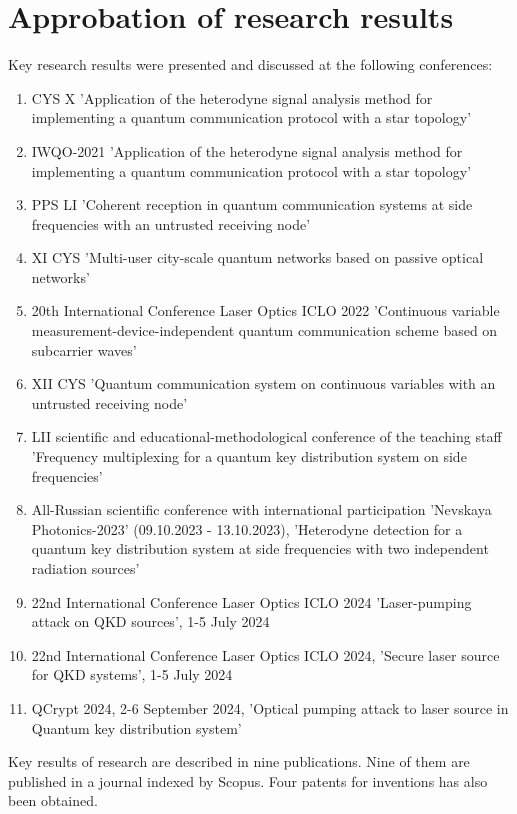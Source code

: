 \section*{Approbation of research results}
Key research results were presented and discussed at the following conferences:
\begin{enumerate}
    \item CYS X 'Application of the heterodyne signal analysis method for implementing a quantum communication protocol with a star topology'
    \item IWQO-2021 'Application of the heterodyne signal analysis method for implementing a quantum communication protocol with a star topology'
    \item PPS LI 'Coherent reception in quantum communication systems at side frequencies with an untrusted receiving node'
    \item XI CYS 'Multi-user city-scale quantum networks based on passive optical networks'
    \item 20th International Conference Laser Optics ICLO 2022 'Continuous variable measurement-device-independent quantum communication scheme based on subcarrier waves'
    \item XII CYS 'Quantum communication system on continuous variables with an untrusted receiving node'
    \item LII scientific and educational-methodological conference of the teaching staff 'Frequency multiplexing for a quantum key distribution system on side frequencies'
    \item All-Russian scientific conference with international participation 'Nevskaya Photonics-2023' (09.10.2023 - 13.10.2023), 'Heterodyne detection for a quantum key distribution system at side frequencies with two independent radiation sources'
    \item 22nd International Conference Laser Optics ICLO 2024 'Laser-pumping attack on QKD sources', 1-5 July 2024
    \item 22nd International Conference Laser Optics ICLO 2024, 'Secure laser source for QKD systems', 1-5 July 2024
    \item QCrypt 2024, 2-6 September 2024, 'Optical pumping attack to laser source in Quantum key distribution system'
\end{enumerate}
Key results of research are described in nine publications. Nine of them are  published in a journal indexed by Scopus. Four patents for inventions has also been obtained.\\

